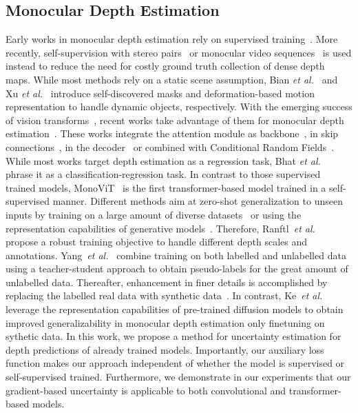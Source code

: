 \subsection{Monocular Depth Estimation}
Early works in monocular depth estimation rely on supervised training~\cite{Eigen2014DepthMP,Laina2016DeeperDP,Song2021MonocularDE,Bauer2021NVSMonoDepthIM,Bhat2021AdaBinsDE}. More recently, self-supervision with stereo pairs~\cite{Godard2017UnsupervisedMD,zhou_diffnet,Tosi2019LearningMD} or monocular video sequences~\cite{Zhou2017UnsupervisedLO,monodepth2} is used instead to reduce the need for costly ground truth collection of dense depth maps. 
While most methods rely on a static scene assumption, Bian \textit{et al.}~\cite{Bian2019UnsupervisedSD} and Xu \textit{et al.}~\cite{Xu2019RegionDN} introduce self-discovered masks and deformation-based motion representation to handle dynamic objects, respectively. With the emerging success of vision transforms~\cite{dosovitskiy2020vit,Lee2021MPViTMV}, recent works take advantage of them for monocular depth estimation~\cite{Bhat2021AdaBinsDE,Ranftl2021VisionTF,Yuan2022NeuralWF,Agarwal_2023_WACV,Yang2021TransformerBasedAN}. These works integrate the attention module as backbone~\cite{Ranftl2021VisionTF}, in skip connections~\cite{Agarwal_2023_WACV}, in the decoder~\cite{Yang2021TransformerBasedAN} or combined with Conditional Random Fields~\cite{Yuan2022NeuralWF}. While most works target depth estimation as a regression task, Bhat \textit{et al.}~\cite{Bhat2021AdaBinsDE} phrase it as a classification-regression task. 
In contrast to those supervised trained models, MonoViT~\cite{monovit} is the first transformer-based model trained in a self-supervised manner. 
Different methods aim at zero-shot generalization to unseen inputs by training on a large amount of diverse datasets~\cite{midas,Ranftl2021VisionTF,yang2024depth,yang2024depthv2} or using the representation capabilities of generative models~\cite{ke2024repurposing}.
Therefore, Ranftl~\textit{et al.}~\cite{midas,Ranftl2021VisionTF} propose a robust training objective to handle different depth scales and annotations.
Yang~\textit{et al.}~\cite{yang2024depth} combine training on both labelled and unlabelled data using a teacher-student approach to obtain pseudo-labels for the great amount of unlabelled data. Thereafter, enhancement in finer details is accomplished by replacing the labelled real data with synthetic data~\cite{yang2024depthv2}.
In contrast, Ke~\textit{et al.}~\cite{ke2024repurposing} leverage the representation capabilities of pre-trained diffusion models to obtain improved generalizability in monocular depth estimation only finetuning on sythetic data.
In this work, we propose a method for uncertainty estimation for depth predictions of already trained models. Importantly, our auxiliary loss function makes our approach independent of whether the model is supervised or self-supervised trained. Furthermore, we demonstrate in our experiments that our gradient-based uncertainty is applicable to both convolutional and transformer-based models.